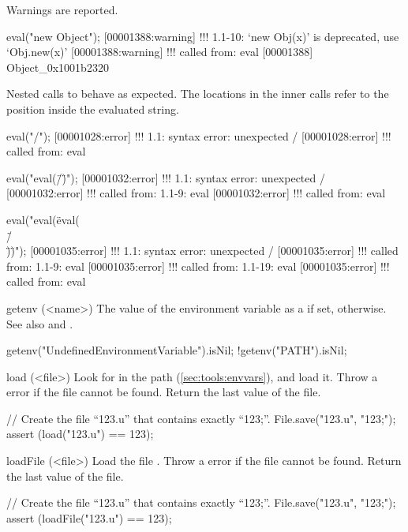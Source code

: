 \begin{urbiscriptapi}
  Warnings are reported.

\begin{urbiscript}
eval("new Object");
[00001388:warning] !!! 1.1-10: `new Obj(x)' is deprecated, use `Obj.new(x)'
[00001388:warning] !!!    called from: eval
[00001388] Object_0x1001b2320
\end{urbiscript}

  Nested calls to  behave as expected.  The locations in the
  inner calls refer to the position inside the evaluated string.

\begin{urbiscript}
eval("/");
[00001028:error] !!! 1.1: syntax error: unexpected /
[00001028:error] !!!    called from: eval

eval("eval(\"/\")");
[00001032:error] !!! 1.1: syntax error: unexpected /
[00001032:error] !!!    called from: 1.1-9: eval
[00001032:error] !!!    called from: eval

eval("eval(\"eval(\\\"/\\\")\")");
[00001035:error] !!! 1.1: syntax error: unexpected /
[00001035:error] !!!    called from: 1.1-9: eval
[00001035:error] !!!    called from: 1.1-19: eval
[00001035:error] !!!    called from: eval
\end{urbiscript}

\item[getenv](<name>)%
  The value of the environment variable  as a 
  if set,  otherwise.  See also  and
  .
\begin{urbiassert}
getenv("UndefinedEnvironmentVariable").isNil;
!getenv("PATH").isNil;
\end{urbiassert}




\item[load](<file>)%
  Look for  in the \urbi path (\autoref{sec:tools:envvars}), and
  load it.  Throw a  error if the file
  cannot be found.  Return the last value of the file.
\begin{urbiscript}
// Create the file ``123.u'' that contains exactly ``123;''.
File.save("123.u", "123;");
assert (load("123.u") == 123);
\end{urbiscript}


\item[loadFile](<file>)%
  Load the \us file .  Throw a 
  error if the file cannot be found.  Return the last value of the file.
\begin{urbiscript}
// Create the file ``123.u'' that contains exactly ``123;''.
File.save("123.u", "123;");
assert (loadFile("123.u") == 123);
\end{urbiscript}



\end{urbiscriptapi}
